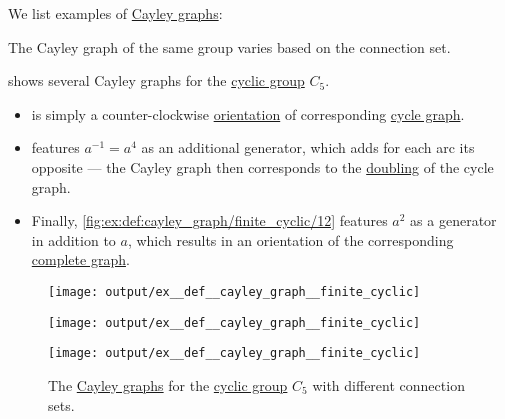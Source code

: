 \begin{example}\label{ex:def:cayley_graph}
  We list examples of \hyperref[def:cayley_graph]{Cayley graphs}:
  \begin{thmenum}
     The Cayley graph of the same group varies based on the connection set.

     shows several Cayley graphs for the \hyperref[def:cyclic_group]{cyclic group} \( C_5 \).
    \begin{itemize}
      \item {} is simply a counter-clockwise \hyperref[def:multigraph_orientation]{orientation} of corresponding \hyperref[def:cycle_graph]{cycle graph}.

      \item {} features \( a^{-1} = a^4 \) as an additional generator, which adds for each arc its opposite --- the Cayley graph then corresponds to the \hyperref[def:graph_functors/simple_doubling]{doubling} of the cycle graph.

      \item Finally, \cref{fig:ex:def:cayley_graph/finite_cyclic/12} features \( a^2 \) as a generator in addition to \( a \), which results in an orientation of the corresponding \hyperref[def:complete_graph]{complete graph}.
    \end{itemize}

    \begin{figure}[!ht]
      \begin{subcaptionblock}{0.3\textwidth}
        \centering
        \texttt{[image: output/ex\_\_def\_\_cayley\_graph\_\_finite\_cyclic]}
        \caption{\( \Gamma(C_5, \set{ a }) \)}\label{fig:ex:def:cayley_graph/finite_cyclic/1}
      \end{subcaptionblock}
      \hfill
      \begin{subcaptionblock}{0.3\textwidth}
        \centering
        \texttt{[image: output/ex\_\_def\_\_cayley\_graph\_\_finite\_cyclic]}
        \caption{\( \Gamma(C_5, \set{ a, a^4 }) \)}\label{fig:ex:def:cayley_graph/finite_cyclic/14}
      \end{subcaptionblock}
      \hfill
      \begin{subcaptionblock}{0.3\textwidth}
        \centering
        \texttt{[image: output/ex\_\_def\_\_cayley\_graph\_\_finite\_cyclic]}
        \caption{\( \Gamma(C_5, \set{ a, a^2 }) \)}\label{fig:ex:def:cayley_graph/finite_cyclic/12}
      \end{subcaptionblock}
      \caption{The \hyperref[def:cayley_graph]{Cayley graphs} for the \hyperref[def:cyclic_group]{cyclic group} \( C_5 \) with different connection sets.}\label{fig:ex:def:cayley_graph/finite_cyclic}
    \end{figure}


\end{thmenum}
\end{example}
